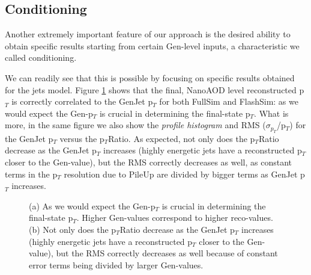 \subsection{Conditioning}

Another extremely important feature of our approach is the desired ability to obtain specific results starting from certain Gen-level inputs, a characteristic we called conditioning. 

We can readily see that this is possible by focusing on specific results obtained for the jets model. Figure \ref{fig:condit} shows that the final, NanoAOD level reconstructed p$_T$ is correctly correlated to the GenJet p$_T$ for both FullSim and FlashSim: as we would expect the Gen-p$_T$ is crucial in determining the final-state p$_T$. What is more, in the same figure we also show the \emph{profile histogram} and RMS ($\sigma_{p_T}$/p$_T$) for the GenJet p$_T$ versus the p$_T$Ratio. As expected, not only does the p$_T$Ratio decrease as the GenJet p$_T$ increases (highly energetic jets have a reconstructed p$_T$ closer to the Gen-value), but the RMS correctly decreases as well, as constant terms in the p$_T$ resolution due to PileUp are divided by bigger terms as GenJet p$_T$ increases.

\begin{figure}
    \myfloatalign
    \caption[Conditioning]{ (a) As we would expect the Gen-p$_T$ is crucial in determining the final-state p$_T$. Higher Gen-values correspond to higher reco-values. (b) Not only does the p$_T$Ratio decrease as the GenJet p$_T$ increases (highly energetic jets have a reconstructed p$_T$ closer to the Gen-value), but the RMS correctly decreases as well because of constant error terms being divided by larger Gen-values.}\label{fig:condit}
    
\end{figure}

